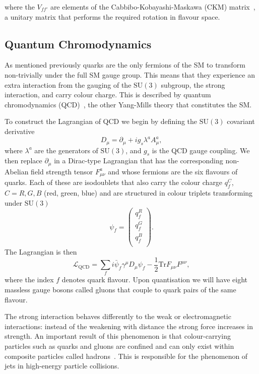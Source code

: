 where the $V_{ff'}$ are elements of the Cabbibo-Kobayashi-Maskawa (CKM) matrix~\cite{Cabibbo,KobayashiMaskawa}, a unitary matrix that performs the required rotation in flavour space.

\subsection{Quantum Chromodynamics}
As mentioned previously quarks are the only fermions of the SM to transform non-trivially under the full SM gauge group. This means that they experience an extra interaction from the gauging of the $\mathrm{SU}(3)$ subgroup, the strong interaction, and carry colour charge. This is described by quantum chromodynamics (QCD)~\cite{PDG}, the other Yang-Mills theory that constitutes the SM. 

To construct the Lagrangian of QCD we begin by defining the $\mathrm{SU}(3)$ covariant derivative
\begin{equation}
    D_{\mu} = \partial_{\mu} + ig_{s}\lambda^{a}A^{a}_{\mu},
\end{equation}
where $\lambda^{a}$ are the generators of $\mathrm{SU}(3)$, and $g_{s}$ is the QCD gauge coupling. We then replace $\partial_{\mu}$ in a Dirac-type Lagrangian that has the corresponding non-Abelian field strength tensor $F^{a}_{\mu\nu}$ and whose fermions are the six flavours of quarks. 
Each of these are isodoublets that also carry the colour charge $q^{C}_{f}$, $C=R,G,B$ (red, green, blue) and are structured in colour triplets transforming under $\mathrm{SU}(3)$
\begin{equation}
    \psi_{f} = \begin{pmatrix}
        q_{f}^{R} \\
        q_{f}^{G} \\
        q_{f}^{B} \\
    \end{pmatrix}.
\end{equation}
The Lagrangian is then
\begin{equation}
    \mathcal{L}_{\mathrm{QCD}} = \sum_{f}i\bar{\psi}_{f}\gamma^{\mu}D_{\mu}\psi_{f} - \frac{1}{2}\mathrm{Tr}F_{\mu\nu}F^{\mu\nu},
\end{equation}
where the index $f$ denotes quark flavour. Upon quantisation we will have eight massless gauge bosons called gluons that couple to quark pairs of the same flavour. 

The strong interaction behaves differently to the weak or electromagnetic interactions: instead of the weakening with distance the strong force increases in strength. An important result of this phenomenon is that colour-carrying particles such as quarks and gluons are confined and can only exist within composite particles called hadrons~\cite{PDG}. This is responsible for the phenomenon of jets in high-energy particle collisions. 

